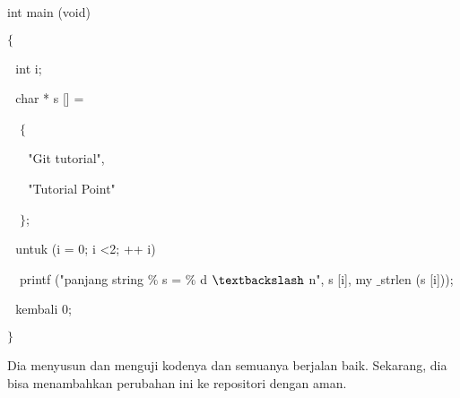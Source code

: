 \vspace{12pt}
\noindent 
 \hspace*{0.5in} int main (void) \par
\noindent 
 \hspace*{0.5in}  $  \{  $ \par
\noindent 
 \hspace*{0.5in}  $  $ $  $ $  $int i; \par
\noindent 
 \hspace*{0.5in}  $  $ $  $ $  $char * s [] = \par
\noindent 
 \hspace*{0.5in}  $  $ $  $ $  $ $  \{  $ \par
\noindent 
 \hspace*{0.5in}  $  $ $  $ $  $ $  $ $  $ $  $"Git tutorial", \par
\noindent 
 \hspace*{0.5in}  $  $ $  $ $  $ $  $ $  $ $  $"Tutorial Point" \par
\noindent 
 \hspace*{0.5in}  $  $ $  $ $  $ $  \}  $; \par
\vspace{12pt}
\noindent 
 \hspace*{0.5in}  $  $ $  $ $  $untuk (i = 0; i <2; ++ i) $  $ $  $ $  $ $  $ $  $ $  $ \par
\noindent 
 $  $ $  $ $  $ \hspace*{0.5in} printf ("panjang string $  \%  $ s = $  \%  $ d  $  \textbackslash  $ n", s [i], my $  \_  $strlen (s [i])); \par
\vspace{12pt}
\noindent 
 \hspace*{0.5in}  $  $ $  $ $  $kembali 0; \par
\noindent 
 \hspace*{0.5in}  $  \}  $ \par
\vspace{12pt}
\noindent 
Dia menyusun dan menguji kodenya dan semuanya berjalan baik. Sekarang, dia bisa menambahkan perubahan ini ke repositori dengan aman. \par

